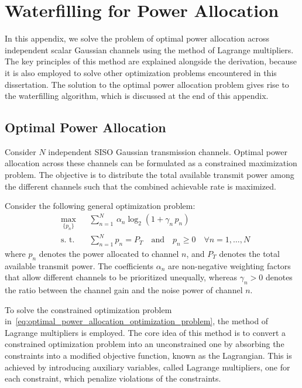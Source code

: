 \chapter{Waterfilling for Power Allocation}
\label{appendix:waterfilling}

In this appendix, we solve the problem of optimal power allocation across independent scalar Gaussian channels using the method of Lagrange multipliers.
The key principles of this method are explained alongside the derivation, because it is also employed to solve other optimization problems encountered in this dissertation.
The solution to the optimal power allocation problem gives rise to the waterfilling algorithm, which is discussed at the end of this appendix.


\section{Optimal Power Allocation}
\label{appendix_section:optimal_power_allocation}

Consider $N$ independent \ac{SISO} Gaussian transmission channels.
Optimal power allocation across these channels can be formulated as a constrained maximization problem.
The objective is to distribute the total available transmit power among the different channels such that the combined achievable rate is maximized.

Consider the following general optimization problem:
\begin{equation}
\label{eq:optimal_power_allocation_optimization_problem}
\begin{aligned}
    & \underset{\{p_n\}}{\text{max}}
    & & \sum_{n=1}^{N} \, \alpha_n \log_2 \left( 1 + \gamma_n \, p_n \right) \\
    & \text{s. t.}
    & & \sum_{n=1}^{N} p_n = P_T \quad \text{and} \quad p_n \geq 0 \quad \forall n = 1, \dots, N
\end{aligned}
\end{equation}
where $p_n$ denotes the power allocated to channel $n$, and $P_T$ denotes the total available transmit power. 
The coefficients $\alpha_n$ are non-negative weighting factors that allow different channels to be prioritized unequally, whereas $\gamma_n > 0$ denotes the ratio between the channel gain and the noise power of channel $n$.

To solve the constrained optimization problem in~\eqref{eq:optimal_power_allocation_optimization_problem}, the method of Lagrange multipliers is employed.
The core idea of this method is to convert a constrained optimization problem into an unconstrained one by absorbing the constraints into a modified objective function, known as the Lagrangian.
This is achieved by introducing auxiliary variables, called Lagrange multipliers, one for each constraint, which penalize violations of the constraints.

